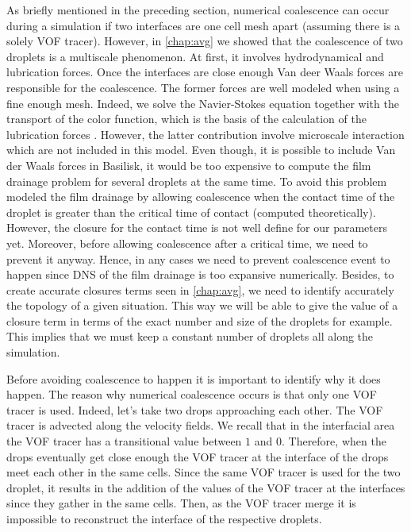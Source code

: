 As briefly mentioned in the preceding section, numerical coalescence can occur during a simulation if two interfaces are one cell mesh apart (assuming there is a solely VOF tracer). 
However, in \ref{chap:avg} we showed that the coalescence of two droplets is a multiscale phenomenon. 
At first, it involves hydrodynamical and lubrication forces.
Once the interfaces are close enough Van deer Waals forces are responsible for the coalescence.
The former forces are well modeled when using a fine enough mesh. 
Indeed, we solve the Navier-Stokes equation together with the transport of the color function, which is the basis of the calculation of the lubrication forces \citep{guazzelli2011}. 
However, the latter contribution involve microscale interaction which are not included in this model.
Even though, it is possible to include Van der Waals forces in Basilisk, it would be too expensive to compute the film drainage problem for several droplets at the same time.
To avoid this problem \citet{thomas2010multiscale} modeled the film drainage by allowing coalescence when the contact time of the droplet is greater than the critical time of contact (computed theoretically).  
However, the closure for the contact time is not well define for our parameters yet.
Moreover, before allowing coalescence after a critical time, we need to prevent it anyway. 
Hence, in any cases we need to prevent coalescence event to happen since DNS of the film drainage is too expansive numerically. 
Besides, to create accurate closures terms seen in \ref{chap:avg}, we need to identify accurately the topology of a given situation.
This way we will be able to give the value of a closure term in terms of the exact number and size of the droplets for example. 
This implies that we must keep a constant number of droplets all along the simulation.

Before avoiding coalescence to happen it is important to identify why it does happen. 
The reason why numerical coalescence occurs is that only one VOF tracer is used. 
Indeed, let's take two drops approaching each other. 
The VOF tracer is advected along the velocity fields. 
We recall that in the interfacial area the VOF tracer has a transitional value between $1$ and $0$. 
Therefore, when the drops eventually get close enough the VOF tracer at the interface of the drops meet each other in the same cells. 
Since the same VOF tracer is used for the two droplet, it results in the addition of the values of the VOF tracer at the interfaces since they gather in the same cells. 
Then, as the VOF tracer merge it is impossible to reconstruct the interface of the respective droplets. 

